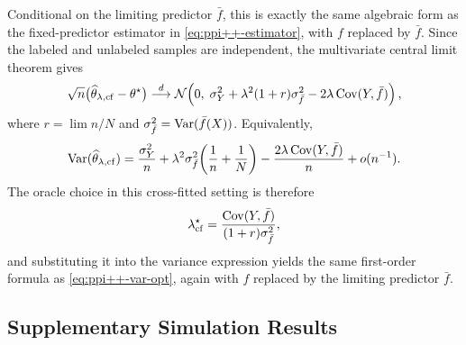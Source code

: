 Conditional on the limiting predictor $\bar f$, this is exactly the same
algebraic form as the fixed-predictor estimator in
\eqref{eq:ppi++-estimator}, with $f$ replaced by $\bar f$. Since the labeled
and unlabeled samples are independent, the multivariate central limit theorem
gives
\[
\sqrt{n}\bigl(\widehat{\theta}_{\lambda,\mathrm{cf}} - \theta^\star\bigr)
\overset{d}{\longrightarrow}
\mathcal N\!\left(
0,\;
\sigma_Y^2 + \lambda^2(1+r)\sigma_{\bar f}^2 - 2\lambda\,\mathrm{Cov}(Y,\bar f)
\right),
\]
where $r = \lim n/N$ and $\sigma_{\bar f}^2 = \mathrm{Var}(\bar f(X))$. Equivalently,
\[
\mathrm{Var}(\widehat{\theta}_{\lambda,\mathrm{cf}})
=
\frac{\sigma_Y^2}{n}
+
\lambda^2\sigma_{\bar f}^2\!\left(\frac{1}{n}+\frac{1}{N}\right)
-
\frac{2\lambda\,\mathrm{Cov}(Y,\bar f)}{n}
+
o(n^{-1}).
\]
The oracle choice in this cross-fitted setting is therefore
\[
\lambda_{\mathrm{cf}}^\star
=
\frac{\mathrm{Cov}(Y,\bar f)}{(1+r)\sigma_{\bar f}^2},
\]
and substituting it into the variance expression yields the same first-order
formula as \eqref{eq:ppi++-var-opt}, again with $f$ replaced by the limiting
predictor $\bar f$.

\subsection{Supplementary Simulation Results}
\label{sec:appendix-sim-summary}

